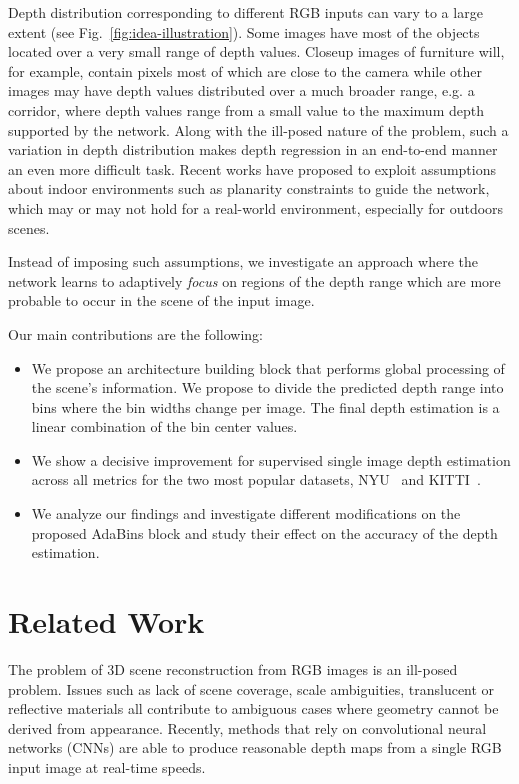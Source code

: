 \documentclass[final]{cvpr}
\begin{document}
Depth distribution corresponding to different RGB inputs can vary to a large extent (see Fig.~\ref{fig:idea-illustration}). Some images have most of the objects located over a very small range of depth values. Closeup images of furniture will, for example, contain pixels most of which are close to the camera while other images may have depth values distributed over a much broader range, e.g. a corridor, where depth values range from a small value to the maximum depth supported by the network. Along with the ill-posed nature of the problem, such a variation in depth distribution makes depth regression in an end-to-end manner an even more difficult task. Recent works have proposed to exploit assumptions about indoor environments such as planarity constraints \cite{bts_lee2019big,dav_huynh2020guiding} to guide the network, which may or may not hold for a real-world environment, especially for outdoors scenes. 

Instead of imposing such assumptions, we investigate an approach where the network learns to adaptively \emph{focus} on regions of the depth range which are more probable to occur in the scene of the input image.

Our main contributions are the following:
\begin{itemize}
    \item We propose an architecture building block that performs global processing of the scene's information. We propose to divide the predicted depth range into bins where the bin widths change per image. The final depth estimation is a linear combination of the bin center values. 
    \item We show a decisive improvement for supervised single image depth estimation across all metrics for the two most popular datasets, NYU~\cite{Silberman2012} and KITTI~\cite{geiger2013vision}.
    \item We analyze our findings and investigate different modifications on the proposed AdaBins block and study their effect on the accuracy of the depth estimation.
\end{itemize}

\section{Related Work}
The problem of 3D scene reconstruction from RGB images is an ill-posed problem. Issues such as lack of scene coverage, scale ambiguities, translucent or reflective materials all contribute to ambiguous cases where geometry cannot be derived from appearance. Recently, methods that rely on convolutional neural networks (CNNs) are able to produce reasonable depth maps from a single RGB input image at real-time speeds.
\end{document}
